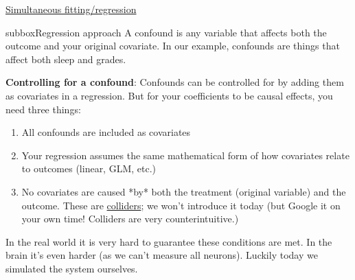 \begin{textbox}{\href{https://compneuro.neuromatch.io/tutorials/W3D5_NetworkCausality/student/W3D5_Tutorial3.html}{Simultaneous fitting/regression }   }
\begin{subbox}{subbox}{Regression approach}
A confound is any variable that affects both the outcome and your original covariate. In our example, confounds are things that affect both sleep and grades. 

\textbf{Controlling for a confound}: 
Confounds can be controlled for by adding them as covariates in a regression. But for your coefficients to be causal effects, you need three things:
 \begin{enumerate}
     \item 
 All confounds are included as covariates
\item  Your regression assumes the same mathematical form of how covariates relate to outcomes (linear, GLM, etc.)
\item  No covariates are caused *by* both the treatment (original variable) and the outcome. These are \href{https://en.wikipedia.org/wiki/Collider_(statistics)}{colliders}; we won't introduce it today (but Google it on your own time! Colliders are very counterintuitive.)
 \end{enumerate}

In the real world it is very hard to guarantee these conditions are met. In the brain it's even harder (as we can't measure all neurons). Luckily today we simulated the system ourselves.

\end{subbox}
\end{textbox}
